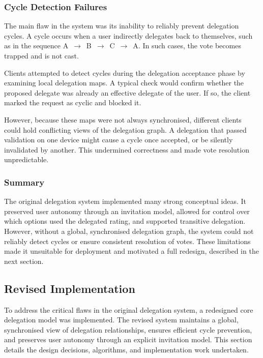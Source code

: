 \subsubsection*{Cycle Detection Failures}

The main flaw in the system was its inability to reliably prevent delegation cycles. A cycle occurs when a user indirectly delegates back to themselves, such as in the sequence A~$\rightarrow$~B~$\rightarrow$~C~$\rightarrow$~A. In such cases, the vote becomes trapped and is not cast.

Clients attempted to detect cycles during the delegation acceptance phase by examining local delegation maps. A typical check would confirm whether the proposed delegate was already an effective delegate of the user. If so, the client marked the request as cyclic and blocked it.

However, because these maps were not always synchronised, different clients could hold conflicting views of the delegation graph. A delegation that passed validation on one device might cause a cycle once accepted, or be silently invalidated by another. This undermined correctness and made vote resolution unpredictable.


\subsubsection*{Summary}

The original delegation system implemented many strong conceptual ideas. It preserved user autonomy through an invitation model, allowed for control over which options used the delegated rating, and supported transitive delegation. However, without a global, synchronised delegation graph, the system could not reliably detect cycles or ensure consistent resolution of votes. These limitations made it unsuitable for deployment and motivated a full redesign, described in the next section.

\subsection{Revised Implementation}\label{subsec:design_core}
To address the critical flaws in the original delegation system, a redesigned core delegation model was implemented. The revised system maintains a global, synchronised view of delegation relationships, ensures efficient cycle prevention, and preserves user autonomy through an explicit invitation model. This section details the design decisions, algorithms, and implementation work undertaken.

